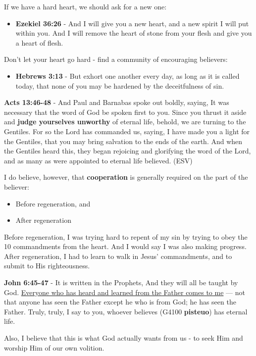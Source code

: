 \documentclass[11pt]{article}
\begin{document}
If we have a hard heart, we should ask for a new one:
\begin{itemize}
\item \textbf{Ezekiel 36:26} - And I will give you a new heart, and a new spirit I will put within you. And I will remove the heart of stone from your flesh and give you a heart of flesh.
\end{itemize}

Don't let your heart go hard - find a community of encouraging believers:
\begin{itemize}
\item \textbf{Hebrews 3:13} - But exhort one another every day, as long as it is called today, that none of you may be hardened by the deceitfulness of sin.
\end{itemize}

\textbf{Acts 13:46-48} - And Paul and Barnabas spoke out boldly, saying, It was necessary that the word of God be spoken first to you.  Since you thrust it aside and \textbf{judge yourselves unworthy} of eternal life, behold, we are turning to the Gentiles.  For so the Lord has commanded us, saying, I have made you a light for the Gentiles, that you may bring salvation to the ends of the earth.  And when the Gentiles heard this, they began rejoicing and glorifying the word of the Lord, and as many as were appointed to eternal life believed. (ESV)

I do believe, however, that \textbf{cooperation} is generally required on the part of the believer:
\begin{itemize}
\item Before regeneration, and
\item After regeneration
\end{itemize}

Before regeneration, I was trying hard to repent of my sin by trying to obey the 10 commandments from the heart.
And I would say I was also making progress.
After regeneration, I had to learn to walk in Jesus' commandments, and to submit to His righteousness.

\textbf{John 6:45-47} - It is written in the Prophets, And they will all be taught by God. \uline{Everyone who has heard and learned from the Father comes to me} — not that anyone has seen the Father except he who is from God; he has seen the Father. Truly, truly, I say to you, whoever believes (G4100 \textbf{pisteuo}) has eternal life.

Also, I believe that this is what God actually wants from us - to seek Him and worship Him of our own volition.
\end{document}
